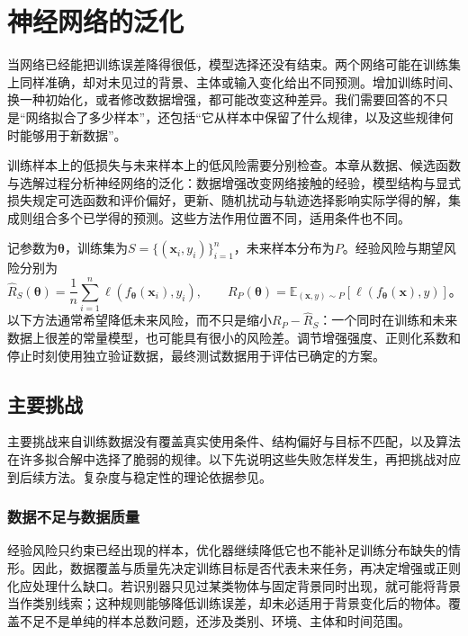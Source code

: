 \chapter{神经网络的泛化}
\label{chap:neural-network-generalization}

当网络已经能把训练误差降得很低，模型选择还没有结束。两个网络可能在训练集上同样准确，却对未见过的背景、主体或输入变化给出不同预测。增加训练时间、换一种初始化，或者修改数据增强，都可能改变这种差异。我们需要回答的不只是“网络拟合了多少样本”，还包括“它从样本中保留了什么规律，以及这些规律何时能够用于新数据”。

训练样本上的低损失与未来样本上的低风险需要分别检查。本章从数据、候选函数与选解过程分析神经网络的泛化：数据增强改变网络接触的经验，模型结构与显式损失规定可选函数和评价偏好，更新、随机扰动与轨迹选择影响实际学得的解，集成则组合多个已学得的预测。这些方法作用位置不同，适用条件也不同。

记参数为$\bm\theta$，训练集为$S=\{(\bm x_i,y_i)\}_{i=1}^n$，未来样本分布为$P$。经验风险与期望风险分别为
\begin{equation}
  \hat R_S(\bm\theta)=\frac1n\sum_{i=1}^n
    \ell(f_{\bm\theta}(\bm x_i),y_i),\qquad
  R_P(\bm\theta)=\mathbb E_{(\bm x,y)\sim P}
    [\ell(f_{\bm\theta}(\bm x),y)]\text{。}
  \label{eq:generalization-risks}
\end{equation}
以下方法通常希望降低未来风险，而不只是缩小$R_P-\hat R_S$：一个同时在训练和未来数据上很差的常量模型，也可能具有很小的风险差。调节增强强度、正则化系数和停止时刻使用独立验证数据，最终测试数据用于评估已确定的方案。

\section{主要挑战}
\label{sec:generalization-challenges}

主要挑战来自训练数据没有覆盖真实使用条件、结构偏好与目标不匹配，以及算法在许多拟合解中选择了脆弱的规律。以下先说明这些失败怎样发生，再把挑战对应到后续方法。复杂度与稳定性的理论依据参见。

\subsection{数据不足与数据质量}
\label{sec:generalization-data-quality}

经验风险只约束已经出现的样本，优化器继续降低它也不能补足训练分布缺失的情形。因此，数据覆盖与质量先决定训练目标是否代表未来任务，再决定增强或正则化应处理什么缺口。若识别器只见过某类物体与固定背景同时出现，就可能将背景当作类别线索；这种规则能够降低训练误差，却未必适用于背景变化后的物体。覆盖不足不是单纯的样本总数问题，还涉及类别、环境、主体和时间范围。

